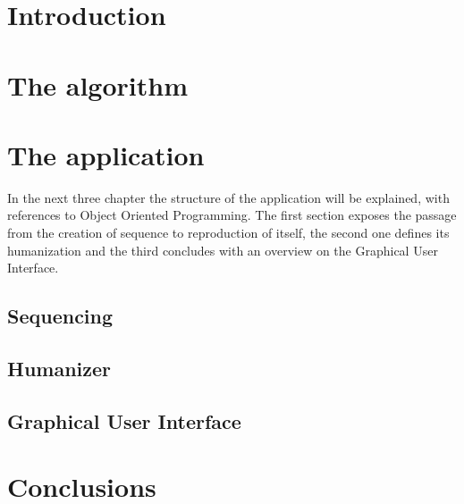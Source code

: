 \documentclass[a4paper, 12pt]{article}
\begin{document}
\section{Introduction}
\label{sec:intro}

\section{The algorithm}
\label{sec:algorithm}

\section{The application}
\label{sec:app}
In the next three chapter the structure of the application will be explained, with references to Object Oriented Programming. The first section exposes the passage from the creation of sequence to reproduction of itself, the second one defines its humanization and the third concludes with an overview on the Graphical User Interface.
\subsection{Sequencing}

\subsection{Humanizer}

\subsection{Graphical User Interface}

\section{Conclusions}
\label{sec:concl}


\end{document}
